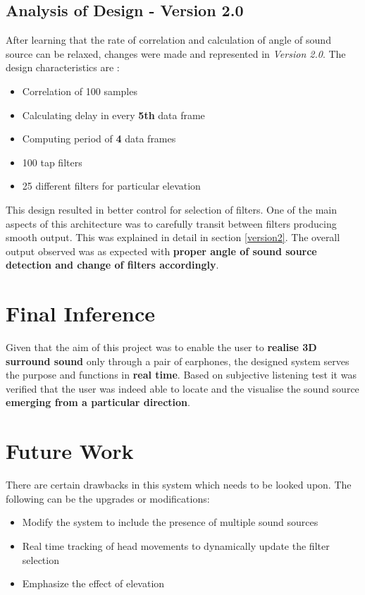 \documentclass[BTech]{nitkdiss}
\begin{document}
\subsection{Analysis of Design - Version 2.0}

After learning that the rate of correlation and calculation of angle of sound source can be relaxed, changes were made and represented in \textit{Version 2.0}. The design characteristics are :

\begin{itemize}
    \item Correlation of 100 samples
    \item Calculating delay in every \textbf{5th} data frame
    \item Computing period of \textbf{4} data frames
    \item 100 tap filters
    \item 25 different filters for particular elevation 
\end{itemize}

This design resulted in better control for selection of filters. One of the main aspects of this architecture was to carefully transit between filters producing smooth output. This was explained in detail in section \ref{version2}. The overall output observed was as expected with \textbf{proper angle of sound source detection and change of filters accordingly}. 


\section{Final Inference}

Given that the aim of this project was to enable the user to \textbf{realise 3D surround sound} only through a pair of earphones, the designed system serves the purpose and functions in \textbf{real time}. Based on subjective listening test it was verified that the user was indeed able to locate and the visualise the sound source \textbf{emerging from a particular direction}. 

\section{Future Work}

There are certain drawbacks in this system which needs to be looked upon. The following can be the upgrades or modifications: 
\begin{itemize}
    \item Modify the system to include the presence of multiple sound sources
    \item Real time tracking of head movements to dynamically update the filter selection
    \item Emphasize the effect of elevation
\end{itemize}
\end{document}
